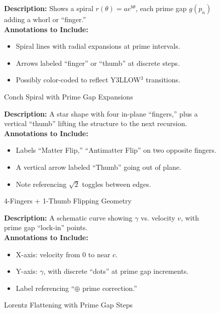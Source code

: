 \documentclass[11pt]{article}
\begin{document}
\begin{figure}[p]
\caption{Conch Spiral with Prime Gap Expansions}
\label{fig:conchSpiral}
\textbf{Description:}  
Shows a spiral $r(\theta) = a e^{b\theta}$, each prime gap $g(p_n)$ adding a whorl or “finger.”
\\[0.5em]
\textbf{Annotations to Include:}
\begin{itemize}
    \item Spiral lines with radial expansions at prime intervals.
    \item Arrows labeled “finger” or “thumb” at discrete steps.
    \item Possibly color-coded to reflect Y3LLOW$^3$ transitions.
\end{itemize}
\end{figure}

\begin{figure}[p]
\caption{4-Fingers + 1-Thumb Flipping Geometry}
\label{fig:fourFingers}
\textbf{Description:}  
A star shape with four in-plane “fingers,” plus a vertical “thumb” lifting the structure to the next recursion.
\\[0.5em]
\textbf{Annotations to Include:}
\begin{itemize}
    \item Labels “Matter Flip,” “Antimatter Flip” on two opposite fingers.
    \item A vertical arrow labeled “Thumb” going out of plane.
    \item Note referencing $\sqrt{2}$ toggles between edges.
\end{itemize}
\end{figure}

\begin{figure}[p]
\caption{Lorentz Flattening with Prime Gap Steps}
\label{fig:lorentzFlattening}
\textbf{Description:}  
A schematic curve showing $\gamma$ vs. velocity $v$, with prime gap “lock-in” points.
\\[0.5em]
\textbf{Annotations to Include:}
\begin{itemize}
    \item X-axis: velocity from 0 to near $c$.
    \item Y-axis: $\gamma$, with discrete “dots” at prime gap increments.
    \item Label referencing “\(\oplus\) prime correction.”
\end{itemize}
\end{figure}
\end{document}
